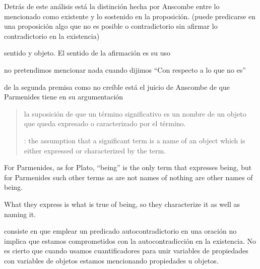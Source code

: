 Detrás de este análisis está la distinción hecha por Anscombe entre lo
mencionado como existente y lo sostenido en la proposición. (puede predicarse en
una proposición algo que no es posible o contradictorio sin afirmar lo
contradictorio en la existencia)

sentido y
objeto. El sentido de la afirmación es su uso

no pretendimos mencionar nada cuando dijimos ``Con respecto a lo que no es''

de la segunda premisa como no creíble está el juicio de
Anscombe de que Parmenides tiene en su argumentación
\blockquote[{\cite[x]{anscombe1981parmenides}}: \textelp{} the assumption that a
significant term is a name of an object which is either expressed or
characterized by the term.]{\textelp{} la suposición de que un término
  significativo es un nombre de un objeto que queda expresado o caracterizado
  por el término.}

For Parmenides, as for Plato, ``being'' is the only term that expresses
being, but for Parmenides such other terms as are not names of nothing are other
names of being.

What they express is what is true of being, so they characterize it as well as
naming it.


consiste en que emplear
un predicado autocontradictorio en una oración no implica que estamos
comprometidos con la autocontradicción en la existencia. No es cierto que cuando
usamos cuantificadores para unir variables de propiedades con variables de
objetos estamos mencionando propiedades u objetos.








